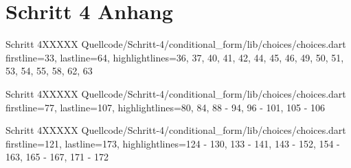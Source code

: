 \clearpage

\chapter{Schritt 4 Anhang} 
\label{appendix:Schritt4Anhang}

\begin{alexlisting}{Schritt 4}{XXXXX}
    {Quellcode/Schritt-4/conditional_form/lib/choices/choices.dart}
    {firstline=33, lastline=64, highlightlines={36, 37, 40, 41, 42, 44, 45, 46, 49, 50, 51, 53, 54, 55, 58, 62, 63}}
    \label{lst:Schritt4KategorieChoice}
  \end{alexlisting}

  \begin{alexlisting}{Schritt 4}{XXXXX}
    {Quellcode/Schritt-4/conditional_form/lib/choices/choices.dart}
    {firstline=77, lastline=107, highlightlines={80, 84, 88 - 94, 96 - 101, 105 - 106 }}
    \label{lst:Schritt4ZielflaecheChoice}
  \end{alexlisting}


  \begin{alexlisting}{Schritt 4}{XXXXX}
    {Quellcode/Schritt-4/conditional_form/lib/choices/choices.dart}
    {firstline=121, lastline=173, highlightlines={124 - 130, 133 - 141, 143 - 152, 154 - 163, 165 - 167, 171 - 172 }}
    \label{lst:Schritt4ZieleinheitChoice}
  \end{alexlisting}

  \clearpage